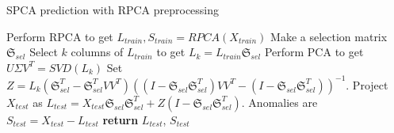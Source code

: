 \documentclass[conference]{IEEEtran}
\begin{document}
\begin{algorithm}
\caption{SPCA prediction with RPCA preprocessing}\label{alg:spca and rpca prediction}
\begin{algorithmic}[1]
\State Perform RPCA to get $L_{train}, S_{train} = RPCA(X_{train})$
\State Make a selection matrix $\mathfrak{S}_{sel}$
\State Select $k$ columns of $L_{train}$ to get $L_k = L_{train} \mathfrak{S}_{sel}$
\State Perform PCA to get $U \Sigma V^T = SVD(L_k)$
\State Set $Z = L_k (\mathfrak{S}_{sel}^T - \mathfrak{S}_{sel}^T V V^T) ((I-\mathfrak{S}_{sel} \mathfrak{S}_{sel}^T)V V^T - (I-\mathfrak{S}_{sel} \mathfrak{S}_{sel}^T))^{-1}$.
\State Project $X_{test}$ as $L_{test} = X_{test} \mathfrak{S}_{sel} \mathfrak{S}_{sel}^T + Z (I-\mathfrak{S}_{sel} \mathfrak{S}_{sel}^T)$.
\State Anomalies are $S_{test} = X_{test} - L_{test}$
\State \textbf{return} $L_{test}$, $S_{test}$
\EndProcedure
\end{algorithmic}
\end{algorithm}
\end{document}
